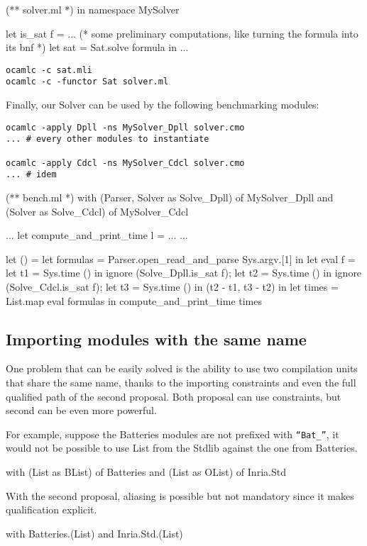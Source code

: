 \documentclass[11pt,a4paper]{article}
\begin{document}
\medskip 

\begin{OCaml}
(** solver.ml *)
in namespace MySolver

let is_sat f =
... 
(* some preliminary computations, like turning the formula into its bnf *)
  let sat = Sat.solve formula in 
...
\end{OCaml}

\begin{verbatim}
ocamlc -c sat.mli
ocamlc -c -functor Sat solver.ml
\end{verbatim}

\medskip

Finally, our Solver can be used by the following benchmarking modules:

\begin{verbatim}
ocamlc -apply Dpll -ns MySolver_Dpll solver.cmo
... # every other modules to instantiate

ocamlc -apply Cdcl -ns MySolver_Cdcl solver.cmo
... # idem 
\end{verbatim}

\begin{OCaml}
(** bench.ml *)
with (Parser, Solver as Solve_Dpll) of MySolver_Dpll
and (Solver as Solve_Cdcl) of MySolver_Cdcl

...
let compute_and_print_time l = ...
...

let () =
  let formulas = 
    Parser.open_read_and_parse Sys.argv.[1] in
  let eval f =
    let t1 = Sys.time () in
    ignore (Solve_Dpll.is_sat f);
    let t2 = Sys.time () in
    ignore (Solve_Cdcl.is_sat f);
    let t3 = Sys.time () in
    (t2 - t1, t3 - t2)
  in
  let times = List.map eval formulas in
  compute_and_print_time times
\end{OCaml}

\subsection{Importing modules with the same name}

One problem that can be easily solved is the ability to use two compilation
units that share the same name, thanks to the importing constraints and even the
full qualified path of the second proposal. Both proposal can use constraints,
but second can be even more powerful.

For example, suppose the Batteries modules are not prefixed with
\texttt{``Bat\_''}, it would not be possible to use List from the Stdlib against
the one from Batteries.

\begin{OCaml}
with (List as BList) of Batteries
and (List as OList) of Inria.Std
\end{OCaml}

With the second proposal, aliasing is possible but not mandatory since it makes
qualification explicit.

\begin{OCaml}
with Batteries.(List)
and Inria.Std.(List)
\end{OCaml}

\end{document}

